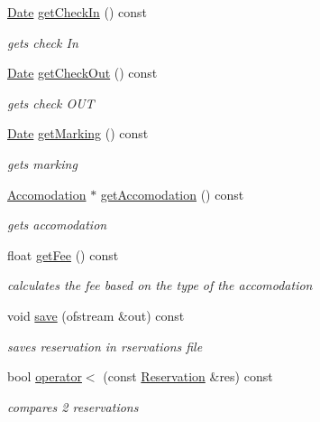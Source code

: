 \begin{DoxyCompactItemize}
\hyperlink{class_date}{Date} \hyperlink{class_reservation_a1a2bec76e916f0bdeedd036093cace9a}{get\+Check\+In} () const
\begin{DoxyCompactList}\small\item\em gets check In \end{DoxyCompactList}\item 
\hyperlink{class_date}{Date} \hyperlink{class_reservation_a74820e32522fcd81b643954314202513}{get\+Check\+Out} () const
\begin{DoxyCompactList}\small\item\em gets check O\+UT \end{DoxyCompactList}\item 
\hyperlink{class_date}{Date} \hyperlink{class_reservation_a0ed41d4b179cb26680898a254c8ccd1d}{get\+Marking} () const
\begin{DoxyCompactList}\small\item\em gets marking \end{DoxyCompactList}\item 
\hyperlink{class_accomodation}{Accomodation} $\ast$ \hyperlink{class_reservation_a752912cd2c421712758cd18e0f6335b3}{get\+Accomodation} () const
\begin{DoxyCompactList}\small\item\em gets accomodation \end{DoxyCompactList}\item 
float \hyperlink{class_reservation_a5d2e10ceb53e119bede30b6e36d39f4d}{get\+Fee} () const
\begin{DoxyCompactList}\small\item\em calculates the fee based on the type of the accomodation \end{DoxyCompactList}\item 
void \hyperlink{class_reservation_aaa4ab6143a49aeb8b4cac348bae44ea2}{save} (ofstream \&out) const
\begin{DoxyCompactList}\small\item\em saves reservation in rservations file \end{DoxyCompactList}\item 
bool \hyperlink{class_reservation_a9d836b9dc4ff0a468cf7d91e9d0a0312}{operator$<$} (const \hyperlink{class_reservation}{Reservation} \&res) const
\begin{DoxyCompactList}\small\item\em compares 2 reservations \end{DoxyCompactList}\end{DoxyCompactItemize}
